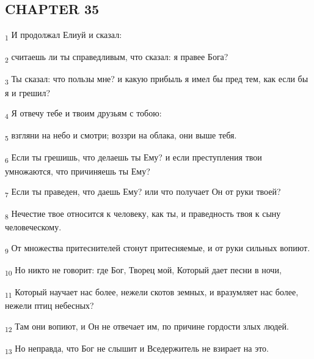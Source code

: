 \subsection{CHAPTER 35}
\begin{tcolorbox}
\textsubscript{1} И продолжал Елиуй и сказал:
\end{tcolorbox}
\begin{tcolorbox}
\textsubscript{2} считаешь ли ты справедливым, что сказал: я правее Бога?
\end{tcolorbox}
\begin{tcolorbox}
\textsubscript{3} Ты сказал: что пользы мне? и какую прибыль я имел бы пред тем, как если бы я и грешил?
\end{tcolorbox}
\begin{tcolorbox}
\textsubscript{4} Я отвечу тебе и твоим друзьям с тобою:
\end{tcolorbox}
\begin{tcolorbox}
\textsubscript{5} взгляни на небо и смотри; воззри на облака, они выше тебя.
\end{tcolorbox}
\begin{tcolorbox}
\textsubscript{6} Если ты грешишь, что делаешь ты Ему? и если преступления твои умножаются, что причиняешь ты Ему?
\end{tcolorbox}
\begin{tcolorbox}
\textsubscript{7} Если ты праведен, что даешь Ему? или что получает Он от руки твоей?
\end{tcolorbox}
\begin{tcolorbox}
\textsubscript{8} Нечестие твое относится к человеку, как ты, и праведность твоя к сыну человеческому.
\end{tcolorbox}
\begin{tcolorbox}
\textsubscript{9} От множества притеснителей стонут притесняемые, и от руки сильных вопиют.
\end{tcolorbox}
\begin{tcolorbox}
\textsubscript{10} Но никто не говорит: где Бог, Творец мой, Который дает песни в ночи,
\end{tcolorbox}
\begin{tcolorbox}
\textsubscript{11} Который научает нас более, нежели скотов земных, и вразумляет нас более, нежели птиц небесных?
\end{tcolorbox}
\begin{tcolorbox}
\textsubscript{12} Там они вопиют, и Он не отвечает им, по причине гордости злых людей.
\end{tcolorbox}
\begin{tcolorbox}
\textsubscript{13} Но неправда, что Бог не слышит и Вседержитель не взирает на это.
\end{tcolorbox}
